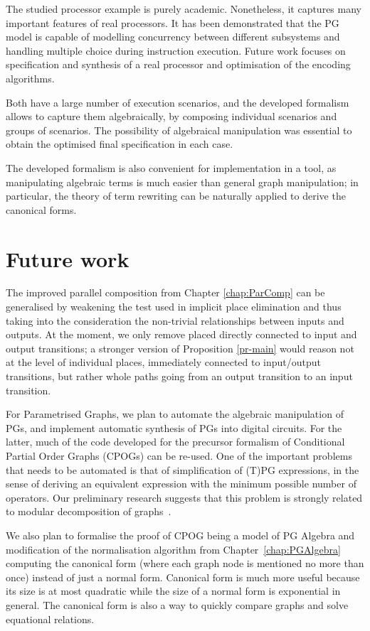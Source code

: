 The studied processor example is purely academic. Nonetheless, it captures
many important features of real processors. It has been demonstrated
that the PG model is capable of modelling concurrency between different
subsystems and handling multiple choice during instruction execution.
Future work focuses on specification and synthesis of a real processor
and optimisation of the encoding algorithms.

Both have a large number of execution scenarios, and the developed
formalism allows to capture them algebraically, by composing individual
scenarios and groups of scenarios. The possibility of algebraical
manipulation was essential to obtain the optimised final specification
in each case.

The developed formalism is also convenient for implementation in a
tool, as manipulating algebraic terms is much easier than general
graph manipulation; in particular, the theory of term rewriting can
be naturally applied to derive the canonical forms.



\section{Future work}
The improved parallel composition from Chapter \ref{chap:ParComp} can
be generalised by weakening the test used in implicit place
elimination and thus taking into the consideration the non-trivial
relationships between inputs and outputs. At the moment, we only
remove placed directly connected to input and output transitions; a
stronger version of Proposition \ref{pr-main} would reason not at
the level of individual places, immediately connected to input/output
transitions, but rather whole paths going from an output transition to
an input transition.

For Parametrised Graphs, we plan to automate the algebraic
manipulation of PGs, and implement automatic synthesis of PGs into
digital circuits. For
the latter, much of the code developed for the precursor formalism
of Conditional Partial Order Graphs (CPOGs) can be re-used. One of
the important problems that needs to be automated is that of
simplification
of (T)PG expressions, in the sense of deriving an equivalent expression
with the minimum possible number of operators. Our preliminary research
suggests that this problem is strongly related to modular decomposition
of graphs~\cite{2005_McConnell_modular}.

We also plan to formalise the proof of CPOG being a model of PG
Algebra and modification of the normalisation algorithm from
Chapter~\ref{chap:PGAlgebra}  computing the canonical form (where each
graph node is mentioned no more than once) instead of just a normal
form. Canonical form is much more useful because its size is at most
quadratic while the size of a normal form is exponential in general.
The canonical form is also a way to quickly compare graphs and solve
equational relations.
